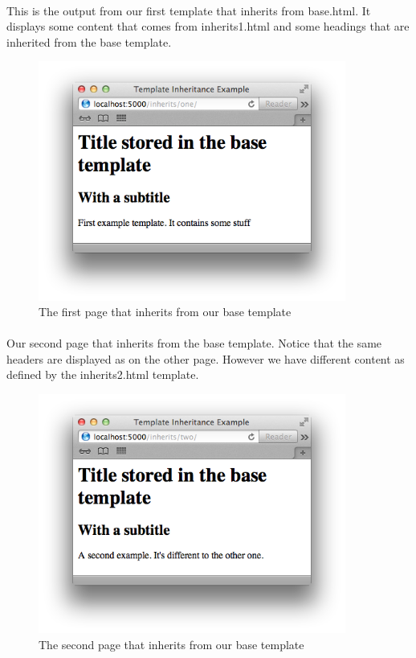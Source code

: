 \documentclass[12pt, a4paper, twoside]{book}
\begin{document}
\paragraph{} This is the output from our first template that inherits from base.html. It displays some content that comes from inherits1.html and some headings that are inherited from the base template.

\begin{figure}[H]
\centering
\includegraphics[width=0.9\textwidth]{images/flask-template-inheritance-1}
\caption{The first page that inherits from our base template}
\label{fig:flask-template-inheritance-1}
\end{figure}

\paragraph{} Our second page that inherits from the base template. Notice that the same headers are displayed as on the other page. However we have different content as defined by the inherits2.html template.

\begin{figure}[H]
\centering
\includegraphics[width=0.9\textwidth]{images/flask-template-inheritance-2}
\caption{The second page that inherits from our base template}
\label{fig:flask-template-inheritance-2}
\end{figure}
\end{document}
